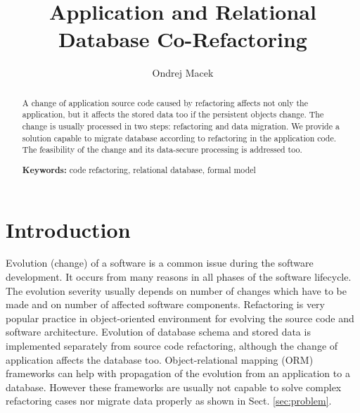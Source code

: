 \documentclass[runningheads]{comsis}
\title{Application and Relational Database Co-Refactoring}
\author{Ondrej Macek\inst{1}}
\institute{Czech Technical University in Prague\\
  Karlovo namesti 13 \\
121 35 Praha 2, Czech Republic\\
  \email{macekond@fel.cvut.cz}}
\begin{document}
\maketitle

\begin{abstract}
A change of application source code caused by refactoring affects not only the application, but it affects the stored data too if the persistent objects change. The change is usually processed in two steps: refactoring and data migration. We provide a solution capable to migrate database according to refactoring in the application code. The feasibility of the change and its data-secure processing is addressed too.

\vspace{6pt}\textbf{Keywords:} code refactoring, relational database, formal model
\end{abstract}


\section{Introduction}
\label{sec:intro}
Evolution (change) of a software is a common issue during the software development. It occurs from many reasons in all phases of the software lifecycle. The evolution severity usually depends on number of changes which have to be made and on number of affected software components. Refactoring \cite{Fowler:Refactoring} is very popular practice in object-oriented environment for evolving the source code and software architecture. Evolution of database schema and stored data is implemented separately from  source code refactoring, although the change of application affects the database too. Object-relational mapping (ORM) frameworks can help with propagation of the evolution from an application to a database. However these frameworks are usually not capable to solve complex refactoring cases nor migrate data properly as shown in Sect. \ref{sec:problem}.

\end{document}
